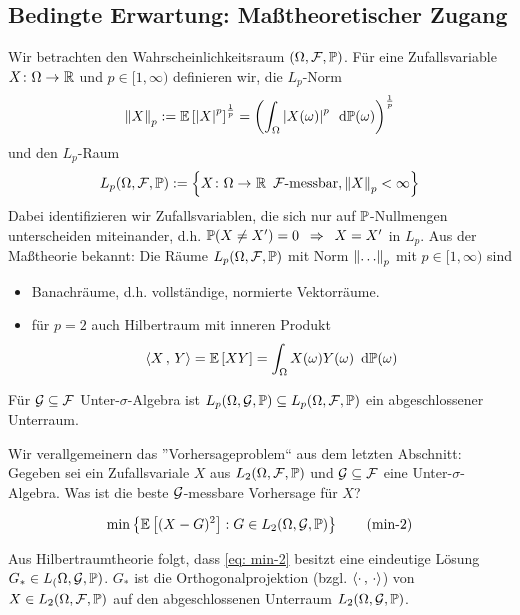 \subsection{Bedingte Erwartung: Maßtheoretischer Zugang}

Wir betrachten den Wahrscheinlichkeitsraum $(\Omega, \F, \P)$. Für eine Zufallsvariable $\abb{X}{\Omega}{\R}$ und $p \in [1,\infty)$ definieren wir, die $L_p$-Norm
\begin{equation*}
\norm{X}_p \defeq \EW[\abs{X}^p]^{\frac{1}{p}} = \brackets{\int_\Omega \abs{X(\omega)}^p \diffskip{\P(\omega)}}^\frac{1}{p}
\end{equation*}
und den $L_p$-Raum
\begin{equation*}
L_p(\Omega, \F, \P) \defeq \menge{\abb{X}{\Omega}{\R} \enskip \F\text{-messbar}, \norm{X}_p < \infty}
\end{equation*}
Dabei identifizieren wir Zufallsvariablen, die sich nur auf $\P$-Nullmengen unterscheiden miteinander, d.h. $\P(X \neq X') = 0 \follows X = X'$ in $L_p$. Aus der Maßtheorie bekannt: Die Räume $L_p(\Omega,\F,\P)$ mit Norm $\norm{\dots}_p$ mit $p \in [1,\infty)$ sind
\begin{itemize}
	\item Banachräume, d.h. vollständige, normierte Vektorräume.
	\item für $p=2$ auch Hilbertraum mit inneren Produkt 
	\begin{equation*}
	\scal{X}{Y} = \EW[XY] = \int_\Omega X(\omega) Y(\omega) \diffskip{\P(\omega)}
	\end{equation*}
\end{itemize}

Für $\G \subseteq \F$ Unter-$\sigma$-Algebra ist $L_p(\Omega,\G,\P) \subseteq L_p(\Omega, \F, \P)$ ein abgeschlossener Unterraum.

Wir verallgemeinern das ''Vorhersageproblem`` aus dem letzten Abschnitt: Gegeben sei ein Zufallsvariale $X$ aus $L_2(\Omega,\F,\P)$ und $\G \subseteq \F$ eine Unter-$\sigma$-Algebra. Was ist die beste $\G$-messbare Vorhersage für $X$?

\begin{equation}
\min\menge{\EW[(X-G)^2] : G \in L_2(\Omega,\G,\P)} \tag{min-2} \label{eq: min-2}
\end{equation}

Aus Hilbertraumtheorie folgt, dass \eqref{eq: min-2} besitzt eine eindeutige Lösung $G_\ast \in L_(\Omega, \G, \P)$. $G_\ast$ ist die Orthogonalprojektion (bzgl. $\scal{\cdot}{\cdot}$) von $X \in L_2(\Omega,\F,\P)$ auf den abgeschlossenen Unterraum $L_2(\Omega,\G,\P)$.

